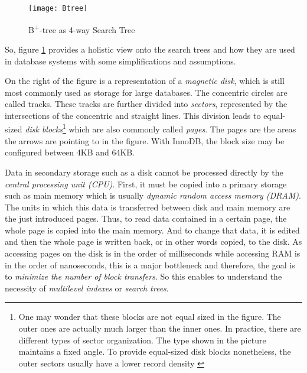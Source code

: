 \begin{figure}[H]
	\centering
	\texttt{[image: Btree]}
	\caption[B\textsuperscript{+}-tree as 4-way Search Tree]{B\textsuperscript{+}-tree as 4-way Search Tree }
	\label{fig:B+tree}
\end{figure}

So, figure \ref{fig:B+tree} provides a holistic view onto the search trees and how they are used in database systems with some simplifications and assumptions.\par 
On the right of the figure is a representation of a \emph{magnetic disk}, which is still most commonly used as storage for large databases. The concentric circles are called tracks. These tracks are further divided into \emph{sectors}, represented by the intersections of the concentric and straight lines. This division leads to equal-sized \emph{disk blocks}\footnote{One may wonder that these blocks are not equal sized in the figure. The outer ones are actually much larger than the inner ones. In practice, there are different types of sector organization. The type shown in the picture maintains a fixed angle. To provide equal-sized disk blocks nonetheless, the outer sectors usually have a lower record density \cite{DatabaseFundamentals}} which are also commonly called \emph{pages}. The pages are the areas the arrows are pointing to in the figure. With InnoDB, the block size may be configured between 4KB and 64KB.\par 
Data in secondary storage such as a disk cannot be processed directly by the \emph{central processing unit (CPU)}. First, it must be copied into a primary storage such as main memory which is usually \emph{dynamic random access memory (DRAM)}. The units in which this data is transferred between disk and main memory are the just introduced pages. Thus, to read data contained in a certain page, the whole page is copied into the main memory. And to change that data, it is edited and then the whole page is written back, or in other words copied, to the disk. As accessing pages on the disk is in the order of milliseconds while accessing RAM is in the order of nanoseconds, this is a major bottleneck and therefore, the goal is to \emph{minimize the number of block transfers}. So this enables to understand the necessity of \emph{multilevel indexes} or \emph{search trees}.\par
